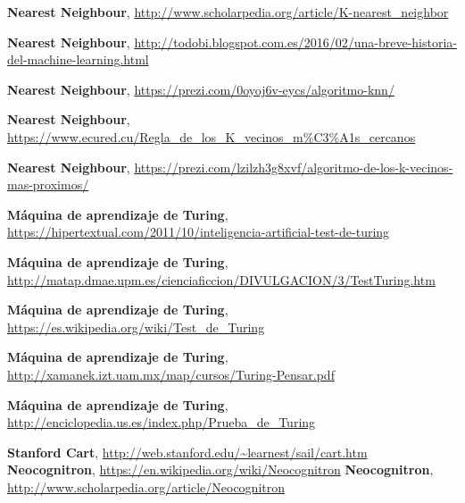 \documentclass[a4paper, 11pt]{article} %
\begin{document}
\begin{thebibliography}{9}
 	\textbf{Nearest Neighbour},
 \url{http://www.scholarpedia.org/article/K-nearest_neighbor}
 
 	\textbf{Nearest Neighbour},
 \url{http://todobi.blogspot.com.es/2016/02/una-breve-historia-del-machine-learning.html}
 
 	\textbf{Nearest Neighbour},
 \url{https://prezi.com/0oyoj6v-eycs/algoritmo-knn/}
 
 	\textbf{Nearest Neighbour},
 \url{https://www.ecured.cu/Regla_de_los_K_vecinos_m%C3%A1s_cercanos}
 
 	\textbf{Nearest Neighbour},
 \url{https://prezi.com/lzilzh3g8xvf/algoritmo-de-los-k-vecinos-mas-proximos/}
 
 	\textbf{Máquina de aprendizaje de Turing},
 \url{https://hipertextual.com/2011/10/inteligencia-artificial-test-de-turing}
 
 	\textbf{Máquina de aprendizaje de Turing},
 \url{http://matap.dmae.upm.es/cienciaficcion/DIVULGACION/3/TestTuring.htm}
 
 	\textbf{Máquina de aprendizaje de Turing},
 \url{https://es.wikipedia.org/wiki/Test_de_Turing}
 
 	\textbf{Máquina de aprendizaje de Turing},
 \url{http://xamanek.izt.uam.mx/map/cursos/Turing-Pensar.pdf}
 
 	\textbf{Máquina de aprendizaje de Turing},
 \url{http://enciclopedia.us.es/index.php/Prueba_de_Turing}
 
    \textbf{Stanford Cart},
    \url{http://web.stanford.edu/~learnest/sail/cart.htm}
 \textbf{Neocognitron},
 \url{https://en.wikipedia.org/wiki/Neocognitron}
 \textbf{Neocognitron},
 \url{http://www.scholarpedia.org/article/Neocognitron}
\end{thebibliography}
\end{document}
